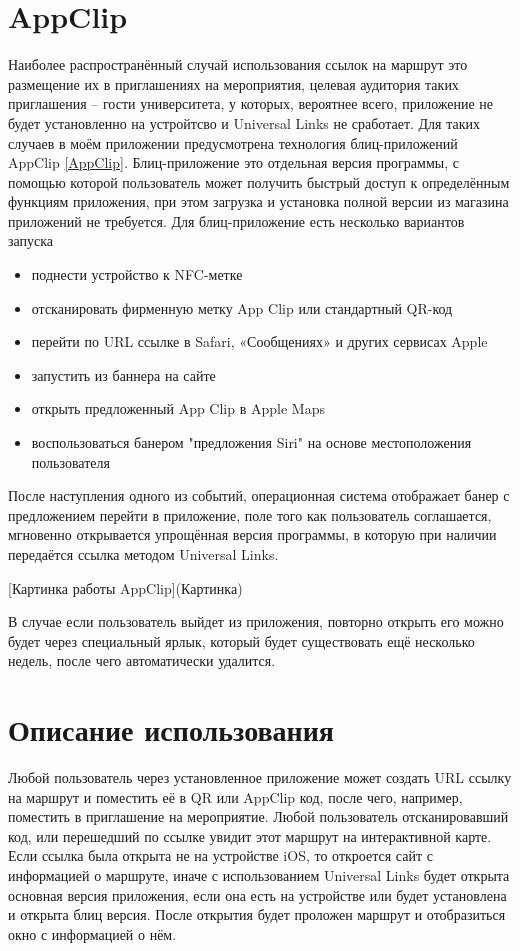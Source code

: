   \section{AppClip}
    Наиболее распространённый случай использования ссылок на маршрут это размещение их в приглашениях на мероприятия, целевая аудитория таких приглашения -- гости университета, у которых, вероятнее всего, приложение не будет установленно на устройтсво и Universal Links не сработает. Для таких случаев в моём приложении предусмотрена технология блиц-приложений AppClip \ref{AppClip}.
    Блиц-приложение это отдельная версия программы, с помощью которой пользователь может получить быстрый доступ к определённым функциям приложения, при этом загрузка и установка полной версии из магазина приложений не требуется.
    Для блиц-приложение есть несколько вариантов запуска
    \begin{itemize}
      \item поднести устройство к NFC-метке
      \item отсканировать фирменную метку App Clip или стандартный QR-код
      \item перейти по URL ссылке в Safari, «Сообщениях» и других сервисах Apple
      \item запустить из баннера на сайте
      \item открыть предложенный App Clip в Apple Maps
      \item воспользоваться банером "предложения Siri" на основе местоположения пользователя
    \end{itemize}


    После наступления одного из событий, операционная система отображает банер с предложением перейти в приложение, поле того как пользователь соглашается, мгновенно открывается упрощённая версия программы, в которую при наличии передаётся ссылка методом Universal Links.

      [Картинка работы AppClip](Картинка)

    В случае если пользователь выйдет из приложения, повторно открыть его можно будет через специальный ярлык, который будет существовать ещё несколько недель, после чего автоматически удалится.

  \section{Описание использования}
    Любой пользователь через установленное приложение может создать URL ссылку на маршрут и поместить её в QR или AppClip код, после чего, например, поместить в приглашение на мероприятие. Любой пользователь отсканировавший код, или перешедший по ссылке увидит этот маршрут на интерактивной карте.
    Если ссылка была открыта не на устройстве iOS, то откроется сайт с информацией о маршруте, иначе с использованием Universal Links будет открыта основная версия приложения, если она есть на устройстве или будет установлена и открыта блиц версия. После открытия будет проложен маршрут и отобразиться окно с информацией о нём.

